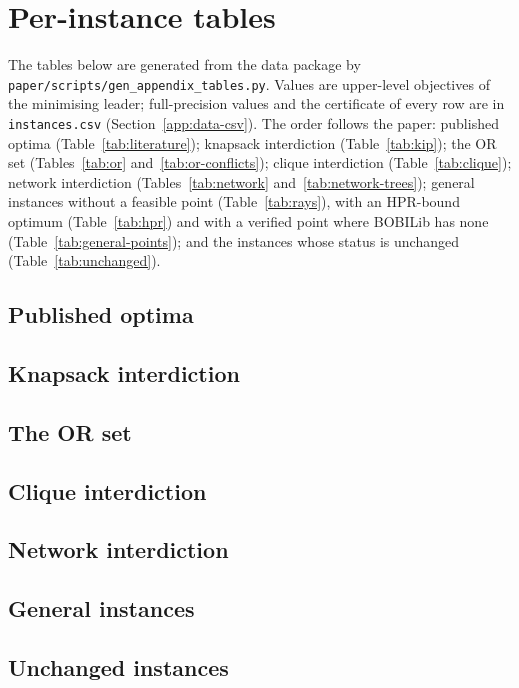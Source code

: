 \clearpage
\section{Per-instance tables}\label{app:tables}

The tables below are generated from the data package by
\texttt{paper/scripts/gen\_appendix\_tables.py}. Values are upper-level
objectives of the minimising leader; full-precision values and the
certificate of every row are in \texttt{instances.csv}
(Section~\ref{app:data-csv}). The order follows the paper:
published optima (Table~\ref{tab:literature}); knapsack interdiction
(Table~\ref{tab:kip}); the OR set (Tables~\ref{tab:or} and~\ref{tab:or-conflicts}); clique
interdiction (Table~\ref{tab:clique}); network interdiction
(Tables~\ref{tab:network} and~\ref{tab:network-trees}); general instances
without a feasible point (Table~\ref{tab:rays}), with an HPR-bound optimum
(Table~\ref{tab:hpr}) and with a verified point where BOBILib has none (Table~\ref{tab:general-points});
and the instances whose status is unchanged (Table~\ref{tab:unchanged}).

\subsection{Published optima}


\subsection{Knapsack interdiction}


\subsection{The OR set}



\subsection{Clique interdiction}


\subsection{Network interdiction}


\subsection{General instances}




\subsection{Unchanged instances}

